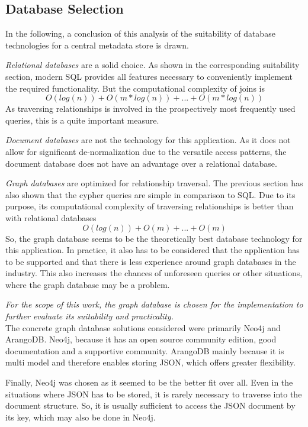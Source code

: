 \subsection{Database Selection}
In the following, a conclusion of this analysis of the suitability of database technologies for a central metadata store is drawn.\par 
\emph{Relational databases} are a solid choice. As shown in the corresponding suitability section, modern SQL provides all features necessary to conveniently implement the required functionality. But the computational complexity of joins is 
$$O(log(n)) + O(m*log(n)) + ... + O(m*log(n))$$
As traversing relationships is involved in the prospectively most frequently used queries, this is a quite important measure.\par 
\emph{Document databases} are not the technology for this application. As it does not allow for significant de-normalization due to the versatile access patterns, the document database does not have an advantage over a relational database.\par 
\emph{Graph databases} are optimized for relationship traversal. The previous section has also shown that the cypher queries are simple in comparison to SQL. Due to its purpose, its computational complexity of traversing relationships is better than with relational databases
$$O(log(n)) + O(m) + ... + O(m)$$
So, the graph database seems to be the theoretically best database technology for this application. In practice, it also has to be considered that the application has to be supported and that there is less experience around graph databases in the industry. This also increases the chances of unforeseen queries or other situations, where the graph database may be a problem.\par 
\emph{For the scope of this work, the graph database is chosen for the implementation to further evaluate its suitability and practicality.}\\

The concrete graph database solutions considered were primarily Neo4j and ArangoDB. Neo4j, because it has an open source community edition, good documentation and a supportive community. ArangoDB mainly because it is multi model and therefore enables storing JSON, which offers greater flexibility.\par 
Finally, Neo4j was chosen as it seemed to be the better fit over all. Even in the situations where JSON has to be stored, it is rarely necessary to traverse into the document structure. So, it is usually sufficient to access the JSON document by its key, which may also be done in Neo4j.

